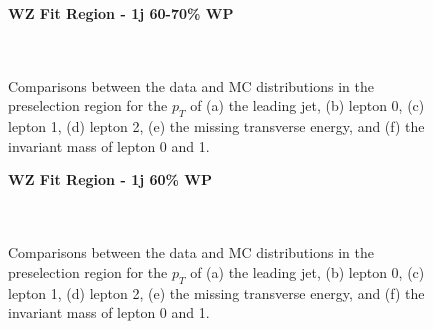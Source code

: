 \begin{figure}[H]
    \centering
    \textbf{WZ Fit Region - 1j 60-70\% WP}\\
    \\
    \\
    \caption{Comparisons between the data and MC distributions in the preselection region for the $p_T$ of (a) the leading jet, (b) lepton 0, (c) lepton 1, (d) lepton 2, (e) the missing transverse energy, and (f) the invariant mass of lepton 0 and 1.}
    \label{kin:WP_1j_60_70}
\end{figure}

\begin{figure}[H]
    \centering
    \textbf{WZ Fit Region - 1j 60\% WP}\\
    \\
    \\
    \caption{Comparisons between the data and MC distributions in the preselection region for the $p_T$ of (a) the leading jet, (b) lepton 0, (c) lepton 1, (d) lepton 2, (e) the missing transverse energy, and (f) the invariant mass of lepton 0 and 1.}
    \label{kin:WP_1j_60}    
\end{figure}

